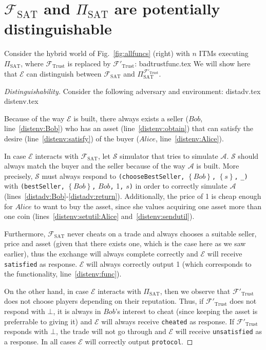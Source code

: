 \section{$\mathcal{F}_{\mathrm{SAT}}$ and $\Pi_{\mathrm{SAT}}$ are potentially
distinguishable}
  Consider the hybrid world of Fig.~\ref{fig:allfuncs} (right) with $n$ ITMs executing
  $\Pi_{\mathrm{SAT}}$, where $\mathcal{F}_{\mathrm{Trust}}$ is replaced by
  $\mathcal{F}'_{\mathrm{Trust}}$:
  {badtrustfunc.tex}
  We will show here that $\mathcal{E}$ can distinguish between
  $\mathcal{F}_{\mathrm{SAT}}$ and $\Pi_{\mathrm{SAT}}^{\mathcal{F}'_{\mathrm{Trust}}}$.
  \begin{proof}[Distinguishability]
    Consider the following adversary and environment:
    {distadv.tex}
    {distenv.tex}

    Because of the way $\mathcal{E}$ is built, there always exists a seller ($Bob$,
    line~\ref{distenv:Bob}) who has an asset (line~\ref{distenv:obtain}) that can satisfy
    the desire (line~\ref{distenv:satisfy}) of the buyer ($Alice$,
    line~\ref{distenv:Alice}).

    In case $\mathcal{E}$ interacts with $\mathcal{F}_{\mathrm{SAT}}$, let $\mathcal{S}$
    simulator that tries to simulate $\mathcal{A}$. $\mathcal{S}$ should always match the
    buyer and the seller because of the way $\mathcal{A}$ is built. More precisely,
    $\mathcal{S}$ must always respond to \texttt{(chooseBestSeller,}
    $\left\{Bob\right\}$\texttt{,} $\left\{s\right\}$\texttt{,} \texttt{\_)} with
    \texttt{(bestSeller,} $\left\{Bob\right\}$\texttt{,} $Bob$\texttt{,} 1\texttt{,}
    $s$\texttt{)} in order to correctly simulate $\mathcal{A}$
    (lines~\ref{distadv:Bob}-\ref{distadv:return}). Additionally, the price of 1 is cheap
    enough for $Alice$ to want to buy the asset, since she values acquiring one asset more
    than one coin (lines~\ref{distenv:setutil:Alice} and~\ref{distenv:sendutil}).

    Furthermore, $\mathcal{F}_{\mathrm{SAT}}$ never cheats on a trade and always chooses a
    suitable seller, price and asset (given that there exists one, which is the case here
    as we saw earlier), thus the exchange will always complete correctly and $\mathcal{E}$
    will receive \texttt{satisfied} as response. $\mathcal{E}$ will always correctly
    output 1 (which corresponds to the functionality, line~\ref{distenv:func}).

    On the other hand, in case $\mathcal{E}$ interacts with $\Pi_{\mathrm{SAT}}$, then we
    observe that $\mathcal{F}'_{\mathrm{Trust}}$ does not choose players depending on
    their reputation.  Thus, if $\mathcal{F}'_{\mathrm{Trust}}$ does not respond with
    $\bot$, it is always in $Bob$'s interest to cheat (since keeping the asset is
    preferrable to giving it) and $\mathcal{E}$ will always receive \texttt{cheated} as
    response. If $\mathcal{F}'_{\mathrm{Trust}}$ responds with $\bot$, the trade will not
    go through and $\mathcal{E}$ will receive \texttt{unsatisfied} as a response. In all
    cases $\mathcal{E}$ will correctly output \texttt{protocol}.
  \end{proof}
